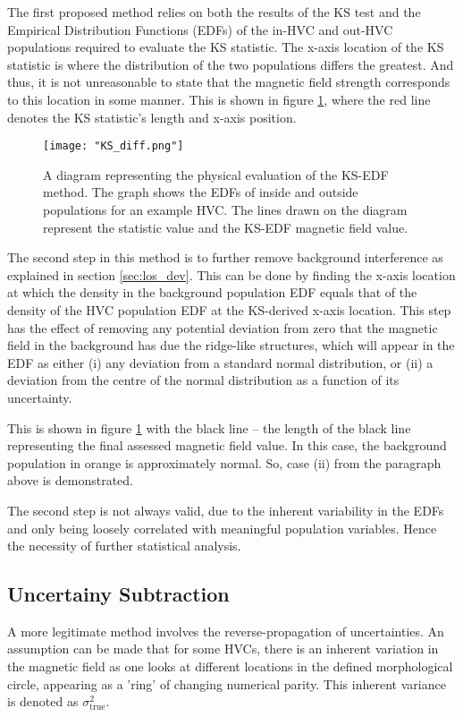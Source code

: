 The first proposed method relies on both the results of the KS test and the Empirical Distribution Functions (EDFs) of the in-HVC and out-HVC populations required to evaluate the KS statistic. The x-axis location of the KS statistic is where the distribution of the two populations differs the greatest. And thus, it is not unreasonable to state that the magnetic field strength corresponds to this location in some manner. This is shown in figure \ref{fig:KSdiff}, where the red line denotes the KS statistic's length and x-axis position.


\begin{figure}
    \texttt{[image: "KS\_diff.png"]}
    \centering
    \caption{A diagram representing the physical evaluation of the KS-EDF method. The graph shows the EDFs of inside and outside populations for an example HVC. The lines drawn on the diagram represent the statistic value and the KS-EDF magnetic field value.}
    \label{fig:KSdiff}
\end{figure}

The second step in this method is to further remove background interference as explained in section \ref{sec:los_dev}. This can be done by finding the x-axis location at which the density in the background population EDF equals that of the density of the HVC population EDF at the KS-derived x-axis location. This step has the effect of removing any potential deviation from zero that the magnetic field in the background has due the ridge-like structures, which will appear in the EDF as either (i) any deviation from a standard normal distribution, or (ii) a deviation from the centre of the normal distribution as a function of its uncertainty.


This is shown in figure \ref{fig:KSdiff} with the black line – the length of the black line representing the final assessed magnetic field value. In this case, the background population in orange is approximately normal. So, case (ii) from the paragraph above is demonstrated.


The second step is not always valid, due to the inherent variability in the EDFs and only being loosely correlated with meaningful population variables. Hence the necessity of further statistical analysis.


\subsection{Uncertainy Subtraction}
\label{ssec:sigma_sub}

A more legitimate method involves the reverse-propagation of uncertainties. An assumption can be made that for some HVCs, there is an inherent variation in the magnetic field as one looks at different locations in the defined morphological circle, appearing as a 'ring' of changing numerical parity. This inherent variance is denoted as $\sigma_{\mathrm{true}}^2$.


